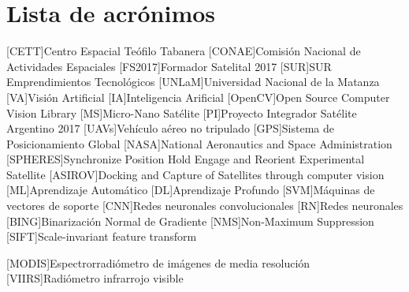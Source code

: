 \chapter*{Lista de acrónimos}
\label{chap:acronimos}

\begin{acronym}[SAOCOM]
[CETT]{Centro Espacial Teófilo Tabanera}
[CONAE]{Comisión Nacional de Actividades Espaciales}
[FS2017]{Formador Satelital 2017}
[SUR]{SUR Emprendimientos Tecnológicos}
[UNLaM]{Universidad Nacional de la Matanza}
[VA]{Visión Artificial}
[IA]{Inteligencia Arificial}
[OpenCV]{Open Source Computer Vision Library}
[MS]{Micro-Nano Satélite}
[PI]{Proyecto Integrador Satélite Argentino 2017}
[UAVs]{Vehículo aéreo no tripulado}
[GPS]{Sistema de Posicionamiento Global}
[NASA]{National Aeronautics and Space Administration}
[SPHERES]{Synchronize Position Hold Engage and Reorient Experimental Satellite}
 [ASIROV]{Docking and Capture of Satellites through computer vision}
[ML]{Aprendizaje Automático}
[DL]{Aprendizaje Profundo}
[SVM]{Máquinas de vectores de soporte}
[CNN]{Redes neuronales convolucionales}
[RN]{Redes neuronales}
[BING]{Binarización Normal de Gradiente}
[NMS]{Non-Maximum Suppression}
[SIFT]{Scale-invariant feature transform}

[MODIS]{Espectrorradiómetro de imágenes de media resolución}
[VIIRS]{Radiómetro infrarrojo visible}
\end{acronym}



